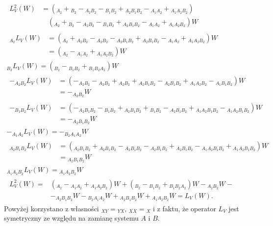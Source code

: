 \documentclass[10pt]{article} %
\begin{document}
\begin{gather}
\begin{split}
L_V^2(W) &= \left({}_{A_2} + {}_{B_2} - {}_{A_2B_2} - {}_{B_1B_2} + {}_{A_2B_1B_2}- {}_{A_1A_2} + {}_{A_1A_2B_2} \right)\\&\quad\left( {}_{A_2} + {}_{B_2} - {}_{A_2B_2} - {}_{B_1B_2} + {}_{A_2B_1B_2} - {}_{A_1A_2} + {}_{A_1A_2B_2}\right)W
\end{split} \\
\begin{split}
{}_{A_2} L_V(W) &= ({}_{A_2} + {}_{A_2B_2} - {}_{A_2B_2} - {}_{A_2B_1B_2} + {}_{A_2B_1B_2} - {}_{A_1A_2} + {}_{A_1A_2B_2})W \\
&= ({}_{A_2} - {}_{A_1A_2} + {}_{A_1A_2B_2})W
\end{split} \\
{}_{B_2} L_V(W) = ({}_{B_2} - {}_{B_1B_2} + {}_{B_1B_2A_2})W \hspace{5cm}\\
\begin{split}
-{}_{A_2B_2}L_V(W) &= (-{}_{A_2B_2} - {}_{A_2B_2} + {}_{A_2B_2} + {}_{A_2B_1B_2} - {}_{A_2B_1B_2} + {}_{A_1A_2B_2} - {}_{A_1B_1B_2})W \\
&= -{}_{A_2B_2}W
\end{split} \\
\begin{split}
-{}_{B_1B_2}L_V(W) &= (-{}_{A_2B_1B_2} - {}_{B_1B_2} +{}_{A_2B_1B_2} + {}_{B_1B_2} - {}_{A_2B_1B_2} + {}_{A_1A_2B_1B_2} - {}_{A_1A_2B_1B_2})W \\
&= -{}_{A_2B_1B_2}W
\end{split} \\
-{}_{A_1A_2} L_V(W) =-{}_{B_2A_1A_2}W \hspace{5cm}\\
\begin{split}
{}_{A_2B_1B_2}L_V(W) &= ({}_{A_2B_1B_2} + {}_{A_2B_1B_2} -{}_{A_2B_1B_2} - {}_{A_2B_1B_2} + {}_{A_2B_1B_2} - {}_{A_1A_2B_1B_2} + {}_{A_1A_2B_1B_2})W \\
&= {}_{A_2B_1B_2}W
\end{split} \\
{}_{A_1A_2B_2}L_V(W) = {}_{A_1A_2B_2}W \hspace{5cm}\\
\begin{split}
L_V^2(W) =&  ({}_{A_2} - {}_{A_1A_2} + {}_{A_1A_2B_2})W +  ({}_{B_2} - {}_{B_1B_2} + {}_{B_1B_2A_2})W  -{}_{A_2B_2}W - \\
&-{}_{A_2B_1B_2}W  -{}_{B_2A_1A_2}W + {}_{A_2B_1B_2}W + {}_{A_1A_2B_2}W = L_V(W).
\end{split}
\end{gather}
Powyżej korzystano z własności ${}_{XY} = {}_{YX}$, ${}_{XX} = {}_X$ i z faktu, że operator $L_V$ jest symetryczny ze względu na zamianę systemu $A$ i $B$.
\end{document}

